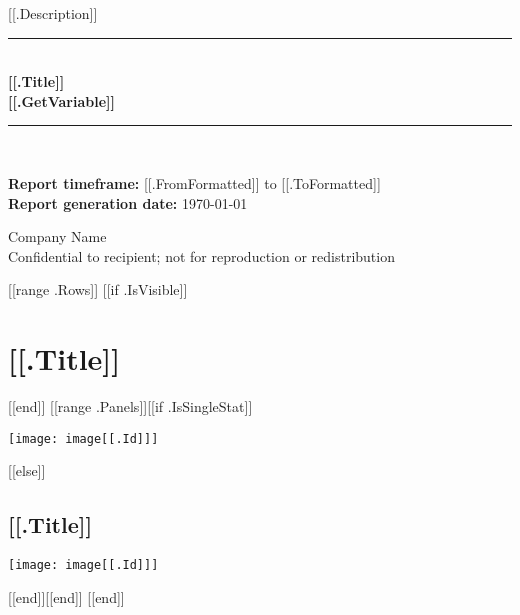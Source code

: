 \documentclass{article}
\begin{document}
\begin{titlepage}
\begin{flushright}
\end{flushright}

\center
\newcommand{\HRule}{\rule{\linewidth}{0.5mm}}

\textsf{\large [[.Description]]}\\[0.5cm]
\HRule \\[0.4cm]
{ \huge \bfseries [[.Title]]}\\[0.4cm]
{ \huge \bfseries [[.GetVariable]]}\\[0.4cm]
\HRule \\[1.5cm]

\begin{flushleft}
\large {\textbf{Report timeframe:} [[.FromFormatted]] to [[.ToFormatted]]}\\
\large {\textbf{Report generation date:} \today}\\[2cm]
\end{flushleft}

\vfill

\textsf{\LARGE Company Name}\\
\textsf{\large Confidential to recipient; not for reproduction or redistribution}\\

\end{titlepage}

\tableofcontents

\begin{center}

[[range .Rows]]
[[if .IsVisible]]
\newpage
\section{[[.Title]]}
[[end]]
[[range .Panels]][[if .IsSingleStat]]\begin{minipage}{0.3\textwidth}
\texttt{[image: image[[.Id]]]}
\end{minipage}
[[else]]\par
\subsection{[[.Title]]}
\vspace{0.5cm}
\texttt{[image: image[[.Id]]]}
\par
\vspace{0.5cm}[[end]][[end]]
[[end]]

\end{center}
\end{document}
